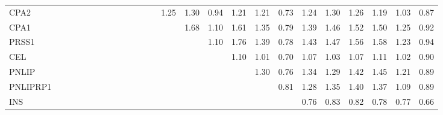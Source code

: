 \begin{longtable}{lrrrrrrrrrrrrrrrrrrrrrrrr}
CPA2     &              &              &              &              &             &             &             &             &            &              &            &            &       1.25 &        1.30 &      0.94 &        1.21 &           1.21 &      0.73 &          1.24 &      1.30 &        1.26 &        1.19 &       1.03 &        0.87 \\
CPA1     &              &              &              &              &             &             &             &             &            &              &            &            &            &        1.68 &      1.10 &        1.61 &           1.35 &      0.79 &          1.39 &      1.46 &        1.52 &        1.50 &       1.25 &        0.92 \\
PRSS1    &              &              &              &              &             &             &             &             &            &              &            &            &            &             &      1.10 &        1.76 &           1.39 &      0.78 &          1.43 &      1.47 &        1.56 &        1.58 &       1.23 &        0.94 \\
CEL      &              &              &              &              &             &             &             &             &            &              &            &            &            &             &           &        1.10 &           1.01 &      0.70 &          1.07 &      1.03 &        1.07 &        1.11 &       1.02 &        0.90 \\
PNLIP    &              &              &              &              &             &             &             &             &            &              &            &            &            &             &           &             &           1.30 &      0.76 &          1.34 &      1.29 &        1.42 &        1.45 &       1.21 &        0.89 \\
PNLIPRP1 &              &              &              &              &             &             &             &             &            &              &            &            &            &             &           &             &                &      0.81 &          1.28 &      1.35 &        1.40 &        1.37 &       1.09 &        0.89 \\
INS      &              &              &              &              &             &             &             &             &            &              &            &            &            &             &           &             &                &           &          0.76 &      0.83 &        0.82 &        0.78 &       0.77 &        0.66 \\

\end{longtable}
